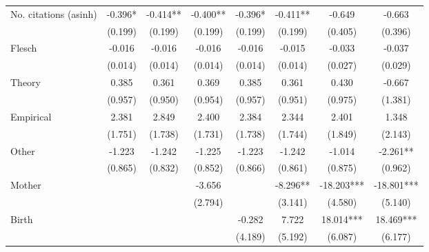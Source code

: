 \begin{table}
\begin{adjustwidth}{-0.085cm}{}
\begin{threeparttable}
\begin{tabular}{p{2.64cm}SSSSSSS}
            No. citations (asinh)         &      -0.396*  &      -0.414** &      -0.400** &      -0.396*  &      -0.411** &      -0.649   &      -0.663   \\
                                          &     (0.199)   &     (0.199)   &     (0.199)   &     (0.199)   &     (0.199)   &     (0.405)   &     (0.396)   \\
            Flesch                        &      -0.016   &      -0.016   &      -0.016   &      -0.016   &      -0.015   &      -0.033   &      -0.037   \\
                                          &     (0.014)   &     (0.014)   &     (0.014)   &     (0.014)   &     (0.014)   &     (0.027)   &     (0.029)   \\
            Theory                        &       0.385   &       0.361   &       0.369   &       0.385   &       0.361   &       0.430   &      -0.667   \\
                                          &     (0.957)   &     (0.950)   &     (0.954)   &     (0.957)   &     (0.951)   &     (0.975)   &     (1.381)   \\
            Empirical                     &       2.381   &       2.849   &       2.400   &       2.384   &       2.344   &       2.401   &       1.348   \\
                                          &     (1.751)   &     (1.738)   &     (1.731)   &     (1.738)   &     (1.744)   &     (1.849)   &     (2.143)   \\
            Other                         &      -1.223   &      -1.242   &      -1.225   &      -1.223   &      -1.242   &      -1.014   &      -2.261** \\
                                          &     (0.865)   &     (0.832)   &     (0.852)   &     (0.866)   &     (0.861)   &     (0.875)   &     (0.962)   \\
            Mother                        &               &               &      -3.656   &               &      -8.296** &     -18.203***&     -18.801***\\
                                          &               &               &     (2.794)   &               &     (3.141)   &     (4.580)   &     (5.140)   \\
            Birth                         &               &               &               &      -0.282   &       7.722   &      18.014***&      18.469***\\
                                          &               &               &               &     (4.189)   &     (5.192)   &     (6.087)   &     (6.177)   \\

\end{tabular}
\end{threeparttable}
\end{adjustwidth}
\end{table}
